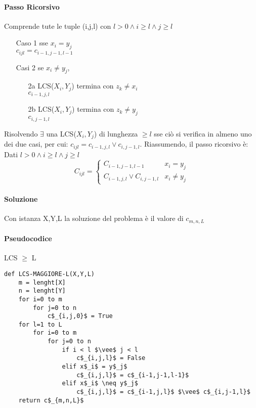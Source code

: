 \documentclass[12pt, a4paper, openany]{book}
\begin{document}
\paragraph*{Passo Ricorsivo}
Comprende tute le tuple (i,j,l) con $l>0 \wedge i\geq l \wedge j \geq l$
\begin{itemize}
	\item[Caso 1] sse $x_i = y_j$\\ $c_{ijl} = c_{i-1,j-1,l-1}$ %
	\item[Casi 2] se  $x_i \neq y_j$,
		\begin{itemize}
			\item[2a] LCS($X_i,Y_j$) termina con $z_k \neq x_i$ \\ $c_{i-1,j,l}$
			\item[2b] LCS($X_i,Y_j$) termina con $z_k \neq y_j$ \\ $c_{i,j-1,l}$
		\end{itemize}
\end{itemize}
Risolvendo $\exists$ una LCS($X_i,Y_j$) di lunghezza $\geq l$ sse ciò si verifica in almeno uno dei due casi, per cui:
$c_{ijl} = c_{i-1,j,l} \vee c_{i,j-1,l}$.
Riassumendo, il passo ricorsivo è:
Dati $l>0 \wedge i\geq l \wedge j \geq l$
\begin{equation}
	C_{ijl} = \begin{cases}
		C_{i-1,j-1,l-1}              & x_i = y_j    \\
		C_{i-1,j,l} \vee C_{i,j-1,l} & x_i \neq y_j
	\end{cases}
\end{equation}


\paragraph*{Soluzione}
Con istanza X,Y,L la soluzione del problema è il valore di $c_{m,n,L}$

\paragraph*{Pseudocodice} LCS $\geq$ L
\begin{lstlisting}[style=small]
def LCS-MAGGIORE-L(X,Y,L)
	m = lenght[X]
	n = lenght[Y]
	for i=0 to m
		for j=0 to n
			c$_{i,j,0}$ = True
	for l=1 to L
		for i=0 to m
			for j=0 to n
				if i < l $\vee$ j < l
					c$_{i,j,l}$ = False
				elif x$_i$ = y$_j$
					c$_{i,j,l}$ = c$_{i-1,j-1,l-1}$
				elif x$_i$ \neq y$_j$
					c$_{i,j,l}$ = c$_{i-1,j,l}$ $\vee$ c$_{i,j-1,l}$
	return c$_{m,n,L}$
\end{lstlisting}
\end{document}
